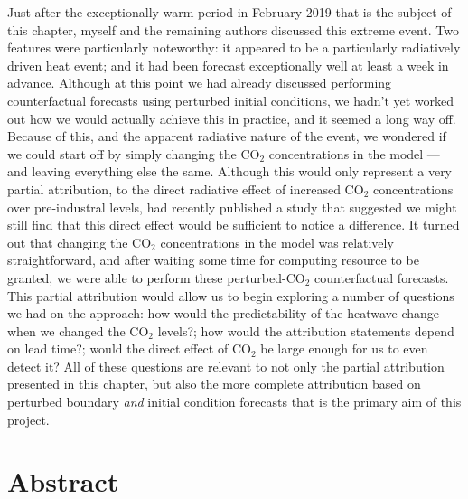   Just after the exceptionally warm period in February 2019 that is the subject of this chapter, myself and the remaining authors discussed this extreme event. Two features were particularly noteworthy: it appeared to be a particularly radiatively driven heat event; and it had been forecast exceptionally well at least a week in advance. Although at this point we had already discussed performing counterfactual forecasts using perturbed initial conditions, we hadn't yet worked out how we would actually achieve this in practice, and it seemed a long way off. Because of this, and the apparent radiative nature of the event, we wondered if we could start off by simply changing the CO$_2$ concentrations in the model --- and leaving everything else the same. Although this would only represent a very partial attribution, to the direct radiative effect of increased CO$_2$ concentrations over pre-industral levels, \citet{baker_higher_2018} had recently published a study that suggested we might still find that this direct effect would be sufficient to notice a difference. It turned out that changing the CO$_2$ concentrations in the model was relatively straightforward, and after waiting some time for computing resource to be granted, we were able to perform these perturbed-CO$_2$ counterfactual forecasts. This partial attribution would allow us to begin exploring a number of questions we had on the approach: how would the predictability of the heatwave change when we changed the CO$_2$ levels?; how would the attribution statements depend on lead time?; would the direct effect of CO$_2$ be large enough for us to even detect it? All of these questions are relevant to not only the partial attribution presented in this chapter, but also the more complete attribution based on perturbed boundary \emph{and} initial condition forecasts that is the primary aim of this project.

\section{Abstract}

